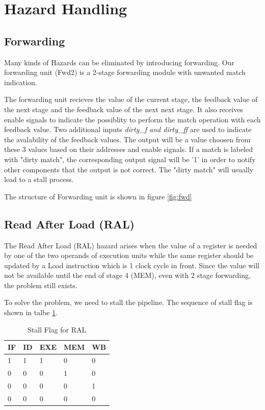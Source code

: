 \section[Hazard Handling]{Hazard Handling}
\label{ch:hazard}
\subsection[Forwarding]{Forwarding}
Many kinds of Hazards can be eliminated by introducing forwarding. Our forwarding
unit (Fwd2) is a 2-stage forwarding module with unwanted match indication.

The forwarding unit recieves the value of the current stage, the feedback value
of the next stage and the feedback value of the next next stage. It also receives
enable signals to indicate the possiblity to perform the match operation with each
feedback value. Two additional inputs {\it dirty\_f and dirty\_ff} are used to
indicate the avalability of the feedback values. The output will be a value choosen from these
3 values based on their addresses and enable signals. If a match is labeled with
"dirty match", the corresponding output signal will be '1' in order to notify other
components that the output is not correct. The "dirty match" will usually lead to
a stall process.

The structure of Forwarding unit is shown in figure \ref{fig:fwd}

\subsection[Read After Load (RAL)]{Read After Load (RAL)}
The Read After Load (RAL) hazard arises when the value of a register is needed by
one of the two operands of execution units while the same register should be
updated by a Load instruction which is 1 clock cycle
in front. Since the value will not be available until the end of stage 4 (MEM), even
with 2 stage forwarding, the problem still exists.

To solve the problem, we need to stall the pipeline. The sequence of stall flag
is shown in talbe \ref{tab:stall_ral}.

\begin{table}[!ht]
\centering
\caption{Stall Flag for RAL}
\label{tab:stall_ral}
\begin{tabular}{|l|l|l|l|l|}
\hline
IF & ID & EXE & MEM & WB \\
\hline
1  & 1  & 1  & 0  & 0\\
0  & 0  & 0  & 1  & 0\\
0  & 0  & 0  & 0  & 1\\
0  & 0  & 0  & 0  & 0 \\
\hline
\end{tabular}
\end{table}

